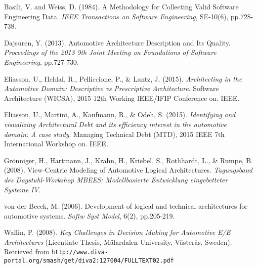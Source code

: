 \begin{thebibliography}{69}

Basili, V. and Weiss, D. (1984). A Methodology for Collecting Valid Software Engineering Data. \textit{IEEE Transactions on Software Engineering}, SE-10(6), pp.728-738.

Dajsuren, Y. (2013). Automotive Architecture Description and Its Quality. \textit{Proceedings of the 2013 9th Joint Meeting on Foundations of Software Engineering}, pp.727-730. 

Eliasson, U., Heldal, R., Pelliccione, P., \& Lantz, J. (2015). \textit{Architecting in the Automotive Domain: Descriptive vs Prescriptive Architecture}. Software Architecture (WICSA), 2015 12th Working IEEE/IFIP Conference on. IEEE.

Eliasson, U., Martini, A., Kaufmann, R., \& Odeh, S. (2015). \textit{Identifying and visualizing Architectural Debt and its efficiency interest in the automotive domain: A case study}. Managing Technical Debt (MTD), 2015 IEEE 7th International Workshop on. IEEE.

Grönniger, H., Hartmann, J., Krahn, H., Kriebel, S., Rothhardt, L., \& Rumpe, B. (2008). View-Centric Modeling of Automotive Logical Architectures. \textit{Tagungsband des Dagstuhl-Workshop MBEES: Modellbasierte Entwicklung eingebetteter Systeme IV}.

von der Beeck, M. (2006). Development of logical and technical architectures for automotive systems. \textit{Softw Syst Model}, 6(2), pp.205-219.

Wallin, P. (2008). \textit{Key Challenges in Decision Making for Automotive E/E Architectures} (Licentiate Thesis, Mälardalen University, Västerås, Sweden). Retrieved from \texttt{http://www.diva-portal.org/smash/get/diva2:127004/FULLTEXT02.pdf} 

\end{thebibliography}
